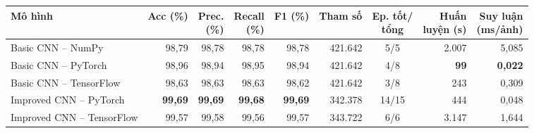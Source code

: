 \begin{tabular}{lrrrrrcrr}
\toprule
Mô hình & Acc (\%) & \makecell[r]{Prec.\\(\%)} & \makecell[r]{Recall\\(\%)} & F1 (\%) & Tham số & \makecell[c]{Ep. tốt/\\tổng} & \makecell[r]{Huấn\\luyện (s)} & \makecell[r]{Suy luận\\(ms/ảnh)} \\
\midrule
Basic CNN – NumPy & 98{,}79 & 98{,}78 & 98{,}78 & 98{,}78 & 421{.}642 & 5/5 & 2{.}007 & 5{,}085 \\
Basic CNN – PyTorch & 98{,}96 & 98{,}94 & 98{,}95 & 98{,}94 & 421{.}642 & 4/8 & \textbf{99} & \textbf{0{,}022} \\
Basic CNN – TensorFlow & 98{,}63 & 98{,}63 & 98{,}63 & 98{,}62 & 421{.}642 & 3/8 & 243 & 0{,}309 \\
Improved CNN – PyTorch & \textbf{99{,}69} & \textbf{99{,}69} & \textbf{99{,}68} & \textbf{99{,}69} & 342{.}378 & 14/15 & 444 & 0{,}048 \\
Improved CNN – TensorFlow & 99{,}57 & 99{,}58 & 99{,}56 & 99{,}57 & 343{.}722 & 6/6 & 3{.}147 & 1{,}644 \\
\bottomrule
\end{tabular}
